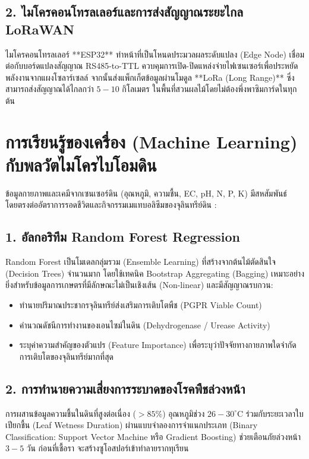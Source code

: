\subsection{2. ไมโครคอนโทรลเลอร์และการส่งสัญญาณระยะไกล LoRaWAN}
ไมโครคอนโทรลเลอร์ **ESP32** ทำหน้าที่เป็นโหนดประมวลผลระดับแปลง (Edge Node) เชื่อมต่อกับบอร์ดแปลงสัญญาณ RS485-to-TTL ควบคุมการเปิด-ปิดแหล่งจ่ายไฟเซนเซอร์เพื่อประหยัดพลังงานจากแผงโซลาร์เซลล์ จากนั้นส่งแพ็กเก็ตข้อมูลผ่านโมดูล **LoRa (Long Range)** ซึ่งสามารถส่งสัญญาณได้ไกลกว่า $5 - 10\text{ กิโลเมตร}$ ในพื้นที่สวนผลไม้โดยไม่ต้องพึ่งพาซิมการ์ดในทุกต้น

\section{การเรียนรู้ของเครื่อง (Machine Learning) กับพลวัตไมโครไบโอมดิน}

ข้อมูลกายภาพและเคมีจากเซนเซอร์ดิน (อุณหภูมิ, ความชื้น, EC, pH, N, P, K) มีสหสัมพันธ์โดยตรงต่ออัตราการรอดชีวิตและกิจกรรมเมแทบอลิซึมของจุลินทรีย์ดิน \cite{thassana_2026, pmid41735330}:

\subsection{1. อัลกอริทึม Random Forest Regression}
Random Forest เป็นโมเดลกลุ่มรวม (Ensemble Learning) ที่สร้างจากต้นไม้ตัดสินใจ (Decision Trees) จำนวนมาก โดยใช้เทคนิค Bootstrap Aggregating (Bagging) เหมาะอย่างยิ่งสำหรับข้อมูลการเกษตรที่มีลักษณะไม่เป็นเชิงเส้น (Non-linear) และมีสัญญาณรบกวน:
\begin{itemize}
    \item ทำนายปริมาณประชากรจุลินทรีย์ส่งเสริมการเติบโตพืช (PGPR Viable Count)
    \item คำนวณดัชนีการทำงานของเอนไซม์ในดิน (Dehydrogenase / Urease Activity)
    \item ระบุค่าความสำคัญของตัวแปร (Feature Importance) เพื่อระบุว่าปัจจัยทางกายภาพใดจำกัดการเติบโตของจุลินทรีย์มากที่สุด
\end{itemize}

\subsection{2. การทำนายความเสี่ยงการระบาดของโรคพืชล่วงหน้า}
การผสานข้อมูลความชื้นในดินที่สูงต่อเนื่อง ($> 85\%$) อุณหภูมิช่วง $26 - 30^\circ\text{C}$ ร่วมกับระยะเวลาใบเปียกชื้น (Leaf Wetness Duration) ผ่านแบบจำลองการจำแนกประเภท (Binary Classification: Support Vector Machine หรือ Gradient Boosting) ช่วยเตือนภัยล่วงหน้า $3 - 5\text{ วัน}$ ก่อนที่เชื้อรา  จะสร้างซูโอสปอร์เข้าทำลายรากทุเรียน

